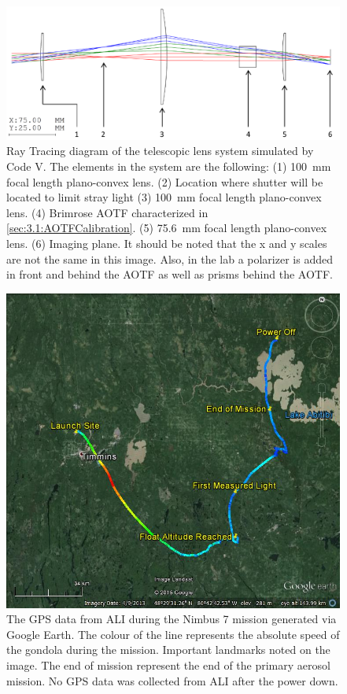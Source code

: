 \documentclass[12pt]{article}
\begin{document}
\begin{figure}[h!]
    \includegraphics[width=1.0\textwidth]{./Images/3-2-TelescopicRayTracing.pdf}
    \caption[ALI Telescopic Design Prototype]{Ray Tracing diagram of the telescopic lens system simulated by Code V. The elements in the system are the following: (1) 100~mm focal length plano-convex lens. (2) Location where shutter will be located to limit stray light (3) 100~mm focal length plano-convex lens. (4) Brimrose AOTF characterized in \autoref{sec:3.1:AOTFCalibration}. (5) 75.6~mm focal length plano-convex lens. (6) Imaging plane. It should be noted that the x and y scales are not the same in this image. Also, in the lab a polarizer is added in front and behind the AOTF as well as prisms behind the AOTF.}
    \label{fig:3.2:telescopicRayTracing}
\end{figure}

\begin{figure}[h!]
    \includegraphics[width=1.0\textwidth]{./Images/5-1-AliGpsDataGoogleMaps.jpg}
    \caption[Flight Path of the Nimbus 7 Mission]{The GPS data from ALI during the Nimbus 7 mission generated via Google Earth. The colour of the line represents the absolute speed of the gondola during the mission. Important landmarks noted on the image. The end of mission represent the end of the primary aerosol mission. No GPS data was collected from ALI after the power down.}
    \label{fig:5.1:nimbus7FlightPath}
\end{figure}
\end{document}
